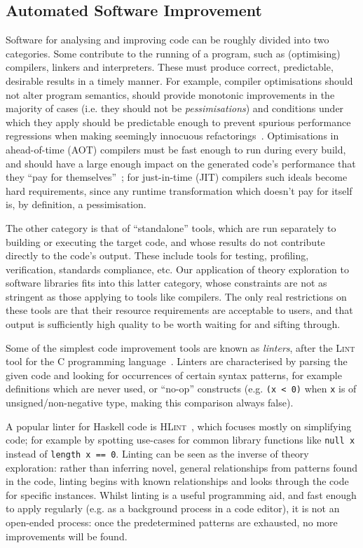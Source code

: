 \subsection{Automated Software Improvement}

Software for analysing and improving code can be roughly divided into two
categories. Some contribute to the running of a program, such as (optimising)
compilers, linkers and interpreters. These must produce correct, predictable,
desirable results in a timely manner. For example, compiler optimisations should
not alter program semantics, should provide monotonic improvements in the
majority of cases (i.e. they should not be \emph{pessimisations}) and conditions
under which they apply should be predictable enough to prevent spurious
performance regressions when making seemingly innocuous
refactorings~\cite{robison2001impact}. Optimisations in ahead-of-time (AOT)
compilers must be fast enough to run during every build, and should have a large
enough impact on the generated code's performance that they
``pay for themselves''~\cite{Franz1994}; for just-in-time (JIT) compilers such
ideals become hard requirements, since any runtime transformation which doesn't
pay for itself is, by definition, a pessimisation.

The other category is that of ``standalone'' tools, which are run separately to
building or executing the target code, and whose results do not contribute
directly to the code's output. These include tools for testing, profiling,
verification, standards compliance, etc. Our application of theory exploration
to software libraries fits into this latter category, whose constraints are not
as stringent as those applying to tools like compilers. The only real
restrictions on these tools are that their resource requirements are acceptable
to users, and that output is sufficiently high quality to be worth waiting for
and sifting through.

Some of the simplest code improvement tools are known as \emph{linters}, after
the \textsc{Lint} tool for the C programming language~\cite{Johnson78lint}.
Linters are characterised by parsing the given code and looking for occurrences
of certain syntax patterns, for example definitions which are never used, or
``no-op'' constructs (e.g. \texttt{(x < 0)} when \texttt{x} is of
unsigned/non-negative type, making this comparison always false).

A popular linter for Haskell code is \textsc{HLint}~\cite{mitchell2014hlint},
which focuses mostly on simplifying code; for example by spotting use-cases for
common library functions like \texttt{null x} instead of \texttt{length x == 0}.
Linting can be seen as the inverse of theory exploration: rather than inferring
novel, general relationships from patterns found in the code, linting begins
with known relationships and looks through the code for specific instances.
Whilst linting is a useful programming aid, and fast enough to apply regularly
(e.g. as a background process in a code editor), it is not an open-ended
process: once the predetermined patterns are exhausted, no more improvements
will be found.

